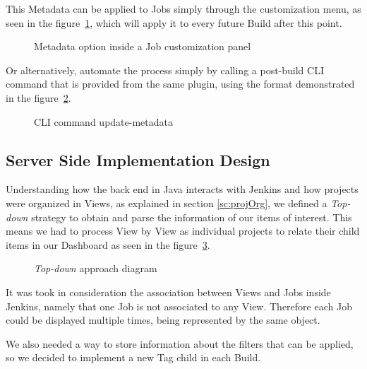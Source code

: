 This Metadata can be applied to Jobs simply through the customization menu, as seen in the figure~\ref{fig:metadataCustom}, which will apply it to every future Build after this point. 

  \begin{figure}[H]
  \centering
      \caption{Metadata option inside a Job customization panel}
      \label{fig:metadataCustom}
  \end{figure}

Or alternatively, automate the process simply by calling a post-build CLI command that is provided from the same plugin, using the format demonstrated in the figure~\ref{fig:updateMetadata}.

  \begin{figure}[H]
  \centering
      \caption{CLI command update-metadata}
      \label{fig:updateMetadata}
  \end{figure}

\subsection{Server Side Implementation Design}\label{sc:implementationDesign}

Understanding how the back end in Java interacts with Jenkins and how projects were organized in Views, as explained in section \ref{sc:projOrg}, we defined a \textit{Top-down} strategy to obtain and parse the information of our items of interest.
This means we had to process View by View as individual projects to relate their child items in our Dashboard as seen in the figure~\ref{fig:dashboardDiagram}.

  \begin{figure}[H]
  \centering
      \caption{\textit{Top-down} approach diagram}
      \label{fig:dashboardDiagram}
  \end{figure}
  
It was took in consideration the association between Views and Jobs inside Jenkins, namely that one Job is not associated to any View. Therefore each Job could be displayed multiple times, being represented by the same object.

We also needed a way to store information about the filters that can be applied, so we decided to implement a new Tag child in each Build. 

